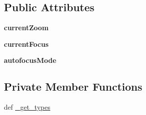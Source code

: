 \subsection*{\-Public \-Attributes}
\begin{DoxyCompactItemize}
\item 
\hypertarget{class_c_i_t_i_u_s___control___communication_1_1msg_1_1__msg__tvinfo_1_1msg__tvinfo_a8b2ebe9b9e79494b438eb65a858b2851}{{\bfseries current\-Zoom}}\label{class_c_i_t_i_u_s___control___communication_1_1msg_1_1__msg__tvinfo_1_1msg__tvinfo_a8b2ebe9b9e79494b438eb65a858b2851}

\item 
\hypertarget{class_c_i_t_i_u_s___control___communication_1_1msg_1_1__msg__tvinfo_1_1msg__tvinfo_a2d792042541a218b471d6f666c2044a4}{{\bfseries current\-Focus}}\label{class_c_i_t_i_u_s___control___communication_1_1msg_1_1__msg__tvinfo_1_1msg__tvinfo_a2d792042541a218b471d6f666c2044a4}

\item 
\hypertarget{class_c_i_t_i_u_s___control___communication_1_1msg_1_1__msg__tvinfo_1_1msg__tvinfo_aba3ff286aa72c93b488b809095638bf9}{{\bfseries autofocus\-Mode}}\label{class_c_i_t_i_u_s___control___communication_1_1msg_1_1__msg__tvinfo_1_1msg__tvinfo_aba3ff286aa72c93b488b809095638bf9}

\end{DoxyCompactItemize}
\subsection*{\-Private \-Member \-Functions}
\begin{DoxyCompactItemize}
\item 
def \hyperlink{class_c_i_t_i_u_s___control___communication_1_1msg_1_1__msg__tvinfo_1_1msg__tvinfo_a2d7d0fbbc1442b8f80d357e518907afc}{\-\_\-get\-\_\-types}
\end{DoxyCompactItemize}

